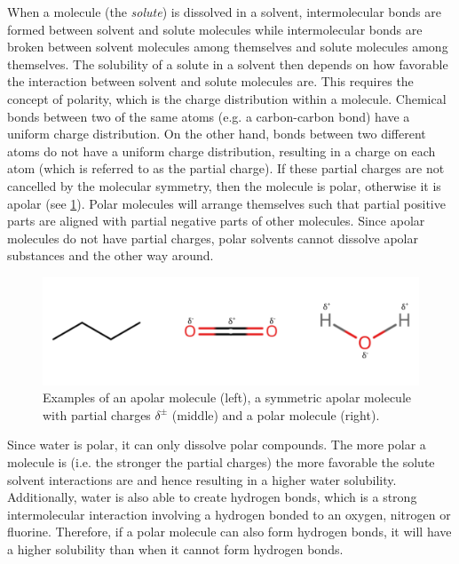 When a molecule (the \textit{solute}) is dissolved in a solvent, intermolecular bonds 
are formed between solvent and solute molecules while intermolecular bonds are broken 
between solvent molecules among themselves and solute molecules among themselves. The 
solubility of a solute in a solvent then depends on how favorable the interaction between 
solvent and solute molecules are. This requires the concept of polarity, which is the charge 
distribution within a molecule. Chemical bonds between two of the same atoms (e.g.
a carbon-carbon bond) have a uniform charge distribution. On the other hand, bonds between 
two different atoms do not have a uniform charge distribution, resulting in a charge on 
each atom (which is referred to as the partial charge).  If these partial charges are 
not cancelled by the molecular symmetry, then the molecule is polar, otherwise it is apolar
(see \cref{fig:polar_apolar molecules}). Polar molecules will arrange themselves such 
that partial positive parts are aligned with partial negative parts of other molecules. 
Since apolar molecules do not have partial charges, polar solvents cannot dissolve apolar 
substances and the other way around.\cite{atkins2023atkins}

\begin{figure}[h]
    \centering
    \includegraphics[scale=0.7]{Fig/polar_apolar_molecules.png}
    \caption{Examples of an apolar molecule (left), a symmetric apolar molecule 
    with partial charges $\delta^{\pm}$ (middle) and a polar molecule (right).}
    \label{fig:polar_apolar molecules}
\end{figure}

Since water is polar, it can only dissolve polar compounds. The more polar a molecule is 
(i.e. the stronger the partial charges) the more favorable the solute solvent interactions 
are and hence resulting in a higher water solubility. Additionally, water is 
also able to create hydrogen bonds, which is a strong intermolecular interaction involving a hydrogen 
bonded to an oxygen, nitrogen or fluorine.\cite{grabowski2006hydrogen} Therefore, if a polar molecule 
can also form hydrogen bonds, it will have a higher solubility than when it cannot form hydrogen bonds.

